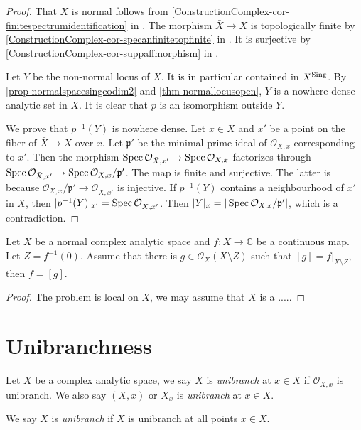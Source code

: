 \begin{proof}
    That $\bar{X}$ is normal follows from \cref{ConstructionComplex-cor-finitespectrumidentification} in .
    The morphism $\bar{X}\rightarrow X$ is topologically finite by \cref{ConstructionComplex-cor-specanfinitetopfinite} in . It is surjective by \cref{ConstructionComplex-cor-suppaffmorphism} in .

    Let $Y$ be the non-normal locus of $X$. It is in particular contained in $X^{\operatorname{Sing}}$. By \cref{prop-normalspacesingcodim2} and \cref{thm-normallocusopen}, $Y$ is a nowhere dense analytic set in $X$. It is clear that $p$ is an isomorphism outside $Y$. 
    
    We prove that $p^{-1}(Y)$ is nowhere dense. Let $x\in X$ and $x'$ be a point on the fiber of $\bar{X}\rightarrow X$ over $x$. Let $\mathfrak{p}'$ be the minimal prime ideal of $\mathcal{O}_{X,x}$ corresponding to $x'$. Then the morphism $\operatorname{Spec} \mathcal{O}_{\bar{X},x'}\rightarrow \operatorname{Spec} \mathcal{O}_{X,x}$ factorizes through $\operatorname{Spec} \mathcal{O}_{\bar{X},x'}\rightarrow \operatorname{Spec} \mathcal{O}_{X,x}/\mathfrak{p}'$. The map is finite and surjective. The latter is because $\mathcal{O}_{X,x}/\mathfrak{p}'\rightarrow \mathcal{O}_{\bar{X},x'}$ is injective. If $p^{-1}(Y)$ contains a neighbourhood of $x'$ in $\bar{X}$, then $|p^{-1}(Y)|_{x'}=\operatorname{Spec} \mathcal{O}_{\bar{X},x'}$. Then $|Y|_x=|\operatorname{Spec} \mathcal{O}_{X,x}/\mathfrak{p}'|$, which is a contradiction.

\end{proof}

\begin{proposition}
    Let $X$ be a normal complex analytic space and $f:X\rightarrow \mathbb{C}$ be a continuous map. Let $Z=f^{-1}(0)$. Assume that there is $g\in \mathcal{O}_X(X\setminus Z)$ such that $[g]=f|_{X\setminus Z}$, then $f=[g]$. 
\end{proposition}
\begin{proof}
    The problem is local on $X$, we may assume that $X$ is a .....
\end{proof}



\section{Unibranchness}
\begin{definition}
    Let $X$ be a complex analytic space, we say $X$ is \emph{unibranch} at $x\in X$ if $\mathcal{O}_{X,x}$ is unibranch. We also say $(X,x)$ or $X_x$ is \emph{unibranch} at $x\in X$.

    We say $X$ is \emph{unibranch} if $X$ is unibranch at all points $x\in X$. 
\end{definition}

